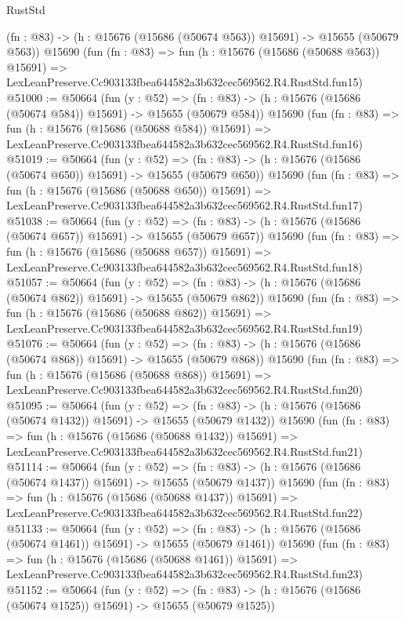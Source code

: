 \begin{lexlean}{RustStd}
\begin{coremodule}
    (fn : @83) -> (h : @15676 (@15686 (@50674 @563)) @15691) -> @15655 (@50679 @563))
    @15690
    (fun (fn : @83) =>
    fun (h : @15676 (@15686 (@50688 @563)) @15691) =>
    LexLeanPreserve.Cc903133fbea644582a3b632cec569562.R4.RustStd.fun15)
@51000 := @50664
    (fun (y : @52) =>
    (fn : @83) -> (h : @15676 (@15686 (@50674 @584)) @15691) -> @15655 (@50679 @584))
    @15690
    (fun (fn : @83) =>
    fun (h : @15676 (@15686 (@50688 @584)) @15691) =>
    LexLeanPreserve.Cc903133fbea644582a3b632cec569562.R4.RustStd.fun16)
@51019 := @50664
    (fun (y : @52) =>
    (fn : @83) -> (h : @15676 (@15686 (@50674 @650)) @15691) -> @15655 (@50679 @650))
    @15690
    (fun (fn : @83) =>
    fun (h : @15676 (@15686 (@50688 @650)) @15691) =>
    LexLeanPreserve.Cc903133fbea644582a3b632cec569562.R4.RustStd.fun17)
@51038 := @50664
    (fun (y : @52) =>
    (fn : @83) -> (h : @15676 (@15686 (@50674 @657)) @15691) -> @15655 (@50679 @657))
    @15690
    (fun (fn : @83) =>
    fun (h : @15676 (@15686 (@50688 @657)) @15691) =>
    LexLeanPreserve.Cc903133fbea644582a3b632cec569562.R4.RustStd.fun18)
@51057 := @50664
    (fun (y : @52) =>
    (fn : @83) -> (h : @15676 (@15686 (@50674 @862)) @15691) -> @15655 (@50679 @862))
    @15690
    (fun (fn : @83) =>
    fun (h : @15676 (@15686 (@50688 @862)) @15691) =>
    LexLeanPreserve.Cc903133fbea644582a3b632cec569562.R4.RustStd.fun19)
@51076 := @50664
    (fun (y : @52) =>
    (fn : @83) -> (h : @15676 (@15686 (@50674 @868)) @15691) -> @15655 (@50679 @868))
    @15690
    (fun (fn : @83) =>
    fun (h : @15676 (@15686 (@50688 @868)) @15691) =>
    LexLeanPreserve.Cc903133fbea644582a3b632cec569562.R4.RustStd.fun20)
@51095 := @50664
    (fun (y : @52) =>
    (fn : @83) -> (h : @15676 (@15686 (@50674 @1432)) @15691) -> @15655 (@50679 @1432))
    @15690
    (fun (fn : @83) =>
    fun (h : @15676 (@15686 (@50688 @1432)) @15691) =>
    LexLeanPreserve.Cc903133fbea644582a3b632cec569562.R4.RustStd.fun21)
@51114 := @50664
    (fun (y : @52) =>
    (fn : @83) -> (h : @15676 (@15686 (@50674 @1437)) @15691) -> @15655 (@50679 @1437))
    @15690
    (fun (fn : @83) =>
    fun (h : @15676 (@15686 (@50688 @1437)) @15691) =>
    LexLeanPreserve.Cc903133fbea644582a3b632cec569562.R4.RustStd.fun22)
@51133 := @50664
    (fun (y : @52) =>
    (fn : @83) -> (h : @15676 (@15686 (@50674 @1461)) @15691) -> @15655 (@50679 @1461))
    @15690
    (fun (fn : @83) =>
    fun (h : @15676 (@15686 (@50688 @1461)) @15691) =>
    LexLeanPreserve.Cc903133fbea644582a3b632cec569562.R4.RustStd.fun23)
@51152 := @50664
    (fun (y : @52) =>
    (fn : @83) -> (h : @15676 (@15686 (@50674 @1525)) @15691) -> @15655 (@50679 @1525))

\end{coremodule}
\end{lexlean}
